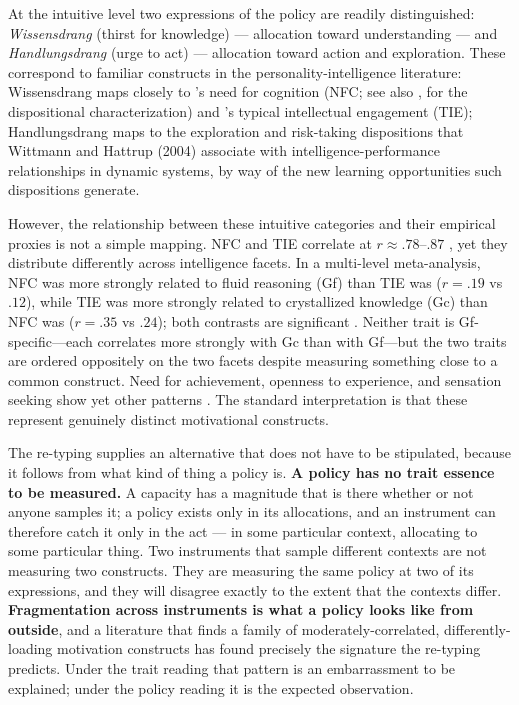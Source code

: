 \documentclass[12pt,a4paper]{article}
\begin{document}
\begin{enumerate}
At the intuitive level two expressions of the policy are readily distinguished: \emph{Wissensdrang} (thirst for knowledge) ---\hspace{0pt} allocation toward understanding ---\hspace{0pt} and \emph{Handlungsdrang} (urge to act) ---\hspace{0pt} allocation toward action and exploration. These correspond to familiar constructs in the personality-intelligence literature: Wissensdrang maps closely to \citeauthor{CacioppioPetty1982}'s \citeyearpar{CacioppioPetty1982} need for cognition (NFC; see also \citealp{Cacioppo1996}, for the dispositional characterization) and \citeauthor{GoffAckerman1992}'s \citeyearpar{GoffAckerman1992} typical intellectual engagement (TIE); Handlungsdrang maps to the exploration and risk-taking dispositions that Wittmann and Hattrup (2004) associate with intelligence-performance relationships in dynamic systems, by way of the new learning opportunities such dispositions generate.

However, the relationship between these intuitive categories and their empirical proxies is not a simple mapping. NFC and TIE correlate at $r \approx .78$--$.87$ \citep{WooHarmsKuncel2007, Schweitzer2025}, yet they distribute differently across intelligence facets. In a multi-level meta-analysis, NFC was more strongly related to fluid reasoning (Gf) than TIE was ($r = .19$ vs $.12$), while TIE was more strongly related to crystallized knowledge (Gc) than NFC was ($r = .35$ vs $.24$); both contrasts are significant \citep{Schweitzer2025}. Neither trait is Gf-specific---\hspace{0pt}each correlates more strongly with Gc than with Gf---\hspace{0pt}but the two traits are ordered oppositely on the two facets despite measuring something close to a common construct. Need for achievement, openness to experience, and sensation seeking show yet other patterns \citep{Ackerman2018}. The standard interpretation is that these represent genuinely distinct motivational constructs.

The re-typing supplies an alternative that does not have to be stipulated, because it follows from what kind of thing a policy is. \textbf{A policy has no trait essence to be measured.} A capacity has a magnitude that is there whether or not anyone samples it; a policy exists only in its allocations, and an instrument can therefore catch it only in the act ---\hspace{0pt} in some particular context, allocating to some particular thing. Two instruments that sample different contexts are not measuring two constructs. They are measuring the same policy at two of its expressions, and they will disagree exactly to the extent that the contexts differ. \textbf{Fragmentation across instruments is what a policy looks like from outside}, and a literature that finds a family of moderately-correlated, differently-loading motivation constructs has found precisely the signature the re-typing predicts. Under the trait reading that pattern is an embarrassment to be explained; under the policy reading it is the expected observation.


\end{enumerate}
\end{document}
